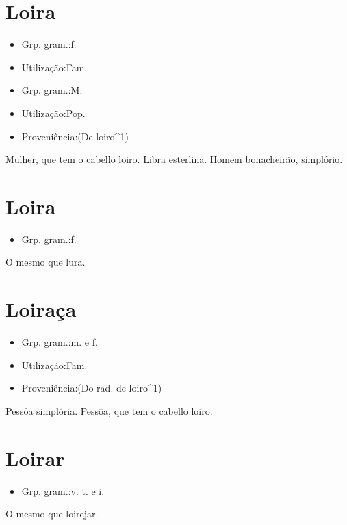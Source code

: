 \section{Loira}
\begin{itemize}
\item {Grp. gram.:f.}
\end{itemize}
\begin{itemize}
\item {Utilização:Fam.}
\end{itemize}
\begin{itemize}
\item {Grp. gram.:M.}
\end{itemize}
\begin{itemize}
\item {Utilização:Pop.}
\end{itemize}
\begin{itemize}
\item {Proveniência:(De \textunderscore loiro\textunderscore ^1)}
\end{itemize}
Mulher, que tem o cabello loiro.
Libra esterlina.
Homem bonacheirão, simplório.
\section{Loira}
\begin{itemize}
\item {Grp. gram.:f.}
\end{itemize}
O mesmo que \textunderscore lura\textunderscore .
\section{Loiraça}
\begin{itemize}
\item {Grp. gram.:m.  e  f.}
\end{itemize}
\begin{itemize}
\item {Utilização:Fam.}
\end{itemize}
\begin{itemize}
\item {Proveniência:(Do rad. de \textunderscore loiro\textunderscore ^1)}
\end{itemize}
Pessôa simplória.
Pessôa, que tem o cabello loiro.
\section{Loirar}
\begin{itemize}
\item {Grp. gram.:v. t.  e  i.}
\end{itemize}
O mesmo que \textunderscore loirejar\textunderscore .

